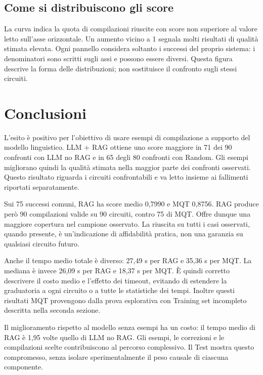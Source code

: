 \subsection{Come si distribuiscono gli score}
\begingroup\small La curva indica la quota di compilazioni riuscite con score non superiore al valore letto sull’asse orizzontale. Un aumento vicino a 1 segnala molti risultati di qualità stimata elevata. Ogni pannello considera soltanto i successi del proprio sistema: i denominatori sono scritti sugli assi e possono essere diversi. Questa figura descrive la forma delle distribuzioni; non sostituisce il confronto sugli stessi circuiti.\par\endgroup
\begin{center}

\end{center}\restoregeometry
\clearpage\section{Conclusioni}
L’esito è positivo per l’obiettivo di usare esempi di compilazione a supporto del modello linguistico. LLM + RAG ottiene uno score maggiore in 71 dei 90 confronti con LLM no RAG e in 65 degli 80 confronti con Random. Gli esempi migliorano quindi la qualità stimata nella maggior parte dei confronti osservati. Questo risultato riguarda i circuiti confrontabili e va letto insieme ai fallimenti riportati separatamente.

Sui 75 successi comuni, RAG ha score medio 0,7990 e MQT 0,8756. RAG produce però 90 compilazioni valide su 90 circuiti, contro 75 di MQT. Offre dunque una maggiore copertura nel campione osservato. La riuscita su tutti i casi osservati, quando presente, è un’indicazione di affidabilità pratica, non una garanzia su qualsiasi circuito futuro.

Anche il tempo medio totale è diverso: 27,49 s per RAG e 35,36 s per MQT. La mediana è invece 26,09 s per RAG e 18,37 s per MQT. È quindi corretto descrivere il costo medio e l’effetto dei timeout, evitando di estendere la graduatoria a ogni circuito o a tutte le statistiche dei tempi. Inoltre questi risultati MQT provengono dalla prova esplorativa con Training set incompleto descritta nella seconda sezione.

Il miglioramento rispetto al modello senza esempi ha un costo: il tempo medio di RAG è 1,95 volte quello di LLM no RAG. Gli esempi, le correzioni e le compilazioni scelte contribuiscono al percorso complessivo. Il Test mostra questo compromesso, senza isolare sperimentalmente il peso causale di ciascuna componente.

